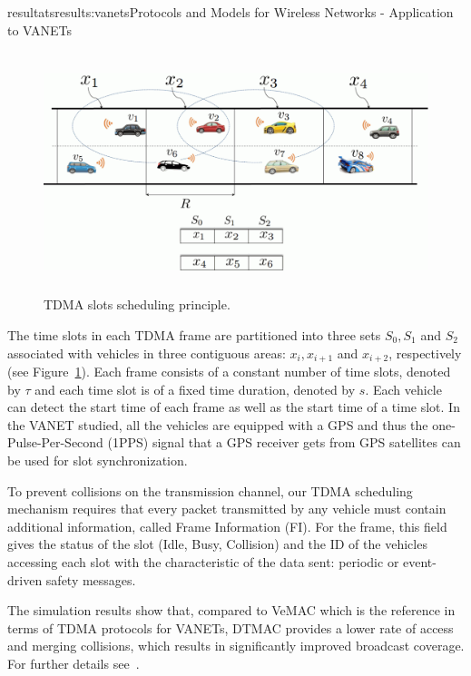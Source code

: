 \documentclass{ra2016}
\begin{document}
\begin{module}{resultats}{results:vanets}{Protocols and Models for Wireless Networks - Application to VANETs}
\begin{figure}[!htbp]
    \begin{center}
        \includegraphics[height=7cm,width=14cm]{IMG/DTMAC_idea.pdf}
    \end{center}
    \caption{TDMA slots scheduling principle.}
    \label{figc:DTMAC_idea}
\end{figure}

The time slots in each TDMA frame are partitioned into three sets $S_0, S_1$ and $S_2$ associated with vehicles in three 
contiguous areas: $x_i, x_{i+1}$ and $x_{i+2}$, respectively (see Figure~\ref{figc:DTMAC_idea}). Each frame consists of a 
constant number of time slots, denoted by $\tau$ and each time slot is of a fixed time duration, denoted by $s$. Each vehicle 
can detect the start time of each frame as well as the start time of a time slot. In the VANET studied, all the vehicles are 
equipped with a GPS and thus the one-Pulse-Per-Second (1PPS) signal that a GPS receiver gets from GPS 
satellites can be used for slot synchronization. 

To prevent collisions on the transmission channel, our TDMA scheduling mechanism requires that every packet transmitted by 
any vehicle must contain additional information, called Frame Information (FI).
For the frame, this field gives the status of the slot (Idle, Busy, Collision) and 
the ID of the vehicles accessing each slot with the characteristic of the data 
sent: periodic or event-driven safety messages.

The simulation results show that, compared to VeMAC which is the reference in terms of TDMA protocols for VANETs, DTMAC provides a lower rate of access and merging collisions, which results in significantly improved broadcast coverage. For further details see~\cite{hadded:hal-01379216}. 


\end{module}
\end{document}
